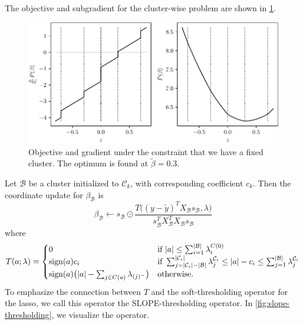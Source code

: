 The objective and subgradient for the cluster-wise problem are shown in
\cref{fig:cluster-grad-obj}.

\begin{figure}[htbp]
  \centering
  \includegraphics[]{figures/clusterupdate-grad-obj}
  \caption{%
    Objective and gradient under the constraint that we have a fixed
    cluster.
    The optimum is found at \(\tilde\beta = 0.3\).
  }%
  \label{fig:cluster-grad-obj}
\end{figure}

Let \(\mathcal{B}\) be a cluster initialized to \(\mathcal{C}_k\), with
corresponding coefficient \(c_k\).
Then the coordinate update for \(\beta_\mathcal{B}\) is
\[
  \beta_\mathcal{B} \gets
  s_\mathcal{B} \odot
  \frac{
    T \big(
    (y - \tilde y)^T X_{\mathcal{B}} s_{\mathcal{B}}, \lambda\big)
  }{
    s_{\mathcal{B}}^T X_{\mathcal{B}}^T X_{\mathcal{B}} s_{\mathcal{B}}
  }
\]
where
\begin{equation}
  \label{eq:slope-thresholding}
  T(a; \lambda) =
  \begin{cases}
    0                                                        & \text{if } |a| \leq \sum_{i=1}^{|\mathcal{B}|}\lambda^{C(0)}_i                                                                                                                      \\
    \operatorname{sign}(a)c_i                                              & \text{if } \sum_{j= |\mathcal{C}_i| - |\mathcal{B}|}^{|\mathcal{C}_i|} \lambda^{\mathcal{C}_i}_j \leq |a| - c_i \leq \sum_{j=1}^{|\mathcal{B}|}\lambda^{\mathcal{C}_i}_j \\
    \operatorname{sign}(a)\big(|a| - \sum_{j \in C(a)}\lambda_{(j)^-}\big) & \text{otherwise.
    }
  \end{cases}
\end{equation}
To emphasize the connection between \(T\) and the soft-thresholding operator
for the lasso, we call this operator the SLOPE-thresholding operator.
In \cref{fig:slope-thresholding}, we visualize the operator.

